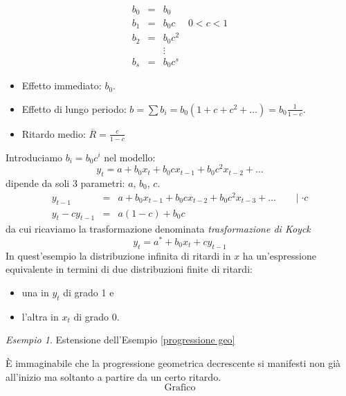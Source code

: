 \documentclass[a4paper]{report}
\newcounter{ese}
\theoremstyle{remark}
\newtheorem{esempio}[ese]{Esempio}
\newcounter{theor}
\begin{document}
\begin{eqnarray*}
b_{0} &=&b_{0} \\
b_{1} &=&b_{0}c\ \ \ \ \ \ 0<c<1 \\
b_{2} &=&b_{0}c^{2} \\
&&\vdots \\
b_{s} &=&b_{0}c^{s}
\end{eqnarray*}

\begin{itemize}
\item Effetto immediato: $b_{0}$.

\item Effetto di lungo periodo: $b=\sum b_{i}=b_{0}\left( 1+c+c^{2}+\ldots
\right) =b_{0}\frac{1}{1-c}$.

\item Ritardo medio: $\overline{R}=\frac{c}{1-c}$
\end{itemize}

Introduciamo $b_{i}=b_{0}c^{i}$ nel modello: 
\begin{equation*}
y_{t}=a+b_{0}x_{t}+b_{0}cx_{t-1}+b_{0}c^{2}x_{t-2}+\ldots
\end{equation*}%
dipende da soli 3 parametri: $a$, $b_{0}$, $c$.%
\begin{eqnarray*}
y_{t-1} &=&a+b_{0}x_{t-1}+b_{0}cx_{t-2}+b_{0}c^{2}x_{t-3}+\ldots \ \ \ \ \ \
\ \ \mid \cdot c \\
y_{t}-cy_{t-1} &=&a(1-c)+b_{0}c
\end{eqnarray*}%
da cui ricaviamo la trasformazione denominata \emph{trasformazione di Koyck}%
\begin{equation*}
y_{t}=a^{\ast }+b_{0}x_{t}+cy_{t-1}
\end{equation*}%
In quest'esempio la distribuzione infinita di ritardi in $x$ ha
un'espressione equivalente in termini di due distribuzioni finite di ritardi:

\begin{itemize}
\item una in $y_{t}$ di grado 1 e

\item l'altra in $x_{t}$ di grado 0.
\end{itemize}

\begin{esempio}
Estensione dell'Esempio \ref{progressione geo}
\end{esempio}

\noindent \`{E} immaginabile che la progressione geometrica decrescente si
manifesti non gi\`{a} all'inizio ma soltanto a partire da un certo ritardo. 
\begin{equation*}
\text{Grafico}
\end{equation*}%
\vspace{5cm}
\end{document}

